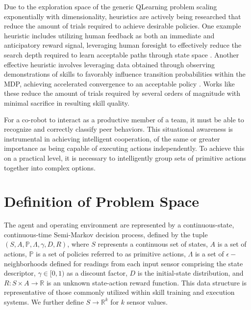 \documentclass[letterpaper]{article}
\begin{document}
Due to the exploration space of the generic QLearning problem scaling exponentially with dimensionality, heuristics are actively being researched that reduce the amount of trials required to achieve desirable policies. One example heuristic includes utilizing human feedback as both an immediate and anticipatory reward signal, leveraging human foresight to effectively reduce the search depth required to learn acceptable paths through state space \cite{TAMER}. Another effective heuristic involves leveraging data obtained through observing demonstrations of skills to favorably influence transition probabilities within the MDP, achieving accelerated convergence to an acceptable policy \cite{LFDSurvey}. Works like these reduce the amount of trials required by several orders of magnitude with minimal sacrifice in resulting skill quality.

For a co-robot to interact as a productive member of a team, it must be able to recognize and correctly classify peer behaviors. This situational awareness is instrumental in achieving intelligent cooperation, of the same or greater importance as being capable of executing actions independently. To achieve this on a practical level, it is necessary to intelligently group sets of primitive actions together into complex options. 

\section{Definition of Problem Space}
\label{sec:pspace}
The agent and operating environment are represented by a continuous-state, continuous-time Semi-Markov decision process, defined by the tuple $(S,A,\mathbb{P},\Lambda,\gamma,D,R)$, where $S$ represents a continuous set of states, $A$ is a set of actions, $\mathbb{P}$ is a set of policies referred to as primitive actions, $\Lambda$ is a set of $\epsilon-$neighborhoods defined for readings from each input sensor comprising the state descriptor, $\gamma \in [0,1)$ as a discount factor, $D$ is the initial-state distribution, and $R : S \times A \rightarrow \mathbb{R}$ is an unknown state-action reward function. This data structure is representative of those commonly utilized within skill training and execution systems. We further define $S \rightarrow \mathbb{R}^k$ for $k$ sensor values.
\end{document}

